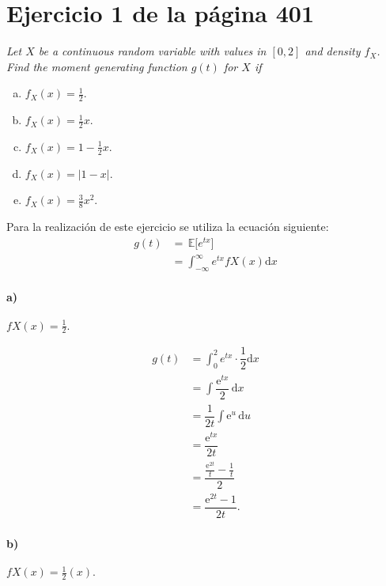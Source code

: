 \documentclass{article}
\newcommand\espe[1]{\, \mathbb{E} \lbrack #1 \rbrack}
\begin{document}
\section{Ejercicio 1 de la página 401 }
\textit{Let $X$ be a continuous random variable with values in $[0,2]$ and density $f_X$. Find the moment generating function $g(t)$ for $X$ if}
\begin{enumerate}[a)]
  \item $f_X(x) = \frac{1}{2}$.
  \item $f_X (x) = \frac{1}{2}x$.
  \item  $f_X (x) = 1 - \frac{1}{2}x$.
  \item $f_X (x) = |1 - x|$.
  \item $f_X (x) = \frac{3}{8}x^2$.
  \end{enumerate}
   Para la realización de este ejercicio se utiliza la ecuación siguiente:
  \begin{align}
    g(t)&=\espe{e^{tx}}\\
       &= \displaystyle\int_{-\infty}^\infty e^{tx}fX(x)\text{d} x
  \end{align}   
     

 
\paragraph{a)}
$fX(x) = \frac{1}{2}.$

\begin{align}
   g(t) &= \displaystyle\int_{0}^2 {e}^{tx}\cdot\dfrac{1}{2}{\mathrm{d}x}   \\
        &=    {\displaystyle\int}\dfrac{\mathrm{e}^{tx}}{2}\,\mathrm{d}x\\
        &= \dfrac{1}{2t}{\displaystyle\int}\mathrm{e}^u\,\mathrm{d}u \\       
        &=  \dfrac{\mathrm{e}^{tx}}{2t} \\
        &=  \dfrac{\frac{\mathrm{e}^{2t}}{t}-\frac{1}{t}}{2}  \\
        &=   \dfrac{\mathrm{e}^{2t}-1}{2t}.
\end{align}
\paragraph{b)}
$fX(x) = \frac{1}{2}(x).$
\end{document}
